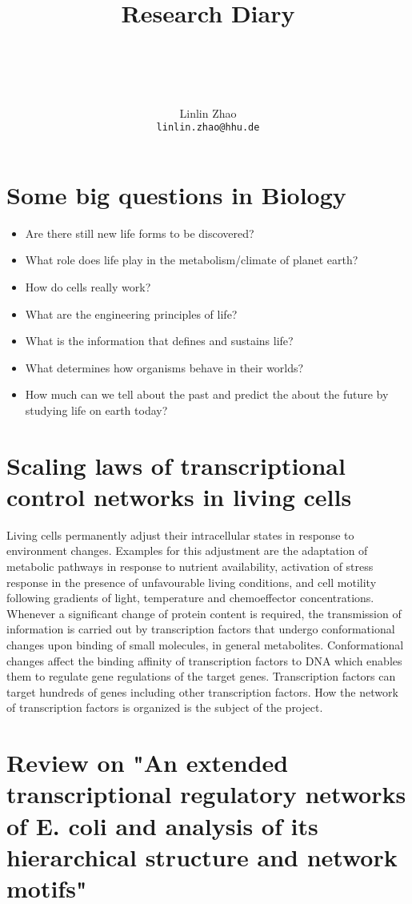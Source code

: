 \documentclass[paper=a4, fontsize=12pt]{scrartcl}	%
\title{ \vspace{-1in} 	\usefont{OT1}{bch}{b}{n}
		\huge \strut Research Diary \strut \\
		\Large \bfseries \strut \strut
}
\author{ 									\usefont{OT1}{bch}{m}{n}
        Linlin Zhao\\		\usefont{OT1}{bch}{m}{n}
        \texttt{linlin.zhao@hhu.de}
}
\date{}
\numberwithin{equation}{section}					%
\numberwithin{figure}{section}					%
\numberwithin{table}{section}					%
\begin{document}
\maketitle

\section{Some big questions in Biology}
\begin{itemize}
\item Are there still new life forms to be discovered?
\item What role does life play in the metabolism/climate of planet earth?
\item How do cells really work?
\item What are the engineering principles of life?
\item What is the information that defines and sustains life?
\item What determines how organisms behave in their worlds?
\item How much can we tell about the past and predict the about the future by studying life on earth today?
\end{itemize}

\section{Scaling laws of transcriptional control networks in living cells}
Living cells permanently adjust their intracellular states in response to environment changes. Examples for this adjustment are the adaptation of metabolic pathways in response to nutrient availability, activation of stress response in the presence of unfavourable living conditions, and cell motility following gradients of light, temperature and chemoeffector concentrations. Whenever a significant change of protein content is required, the transmission of information is carried out by transcription factors that undergo conformational changes upon binding of small molecules, in general metabolites. Conformational changes affect the binding affinity of transcription factors to DNA which enables them to regulate gene regulations of the target genes. Transcription factors can target hundreds of genes including other transcription factors. How the network of transcription factors is organized is the subject of the project. 


\section{Review on "An extended transcriptional regulatory networks of E. coli and analysis of its hierarchical structure and network motifs"}
\end{document}
